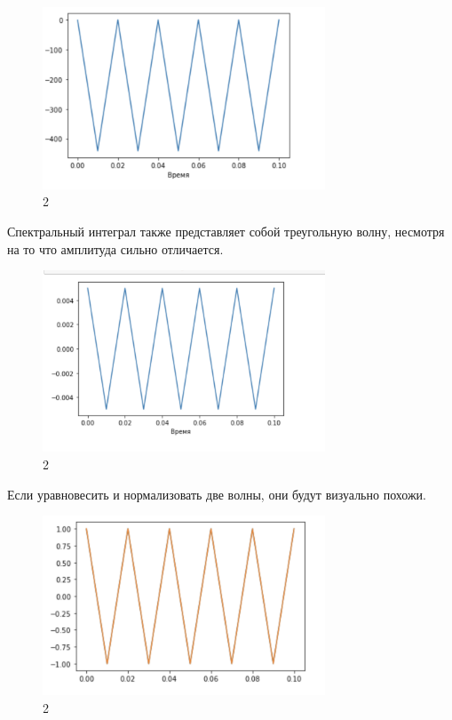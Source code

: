 \documentclass[10pt,a4paper,oneside]{article}
\begin{document}
\begin{figure}[H]
        \centering
        \includegraphics[width=0.75\textwidth]{pics/5.png}
        \caption{2}
        \label{fig:first}
\end{figure}

Спектральный интеграл также представляет собой треугольную волну, несмотря на то что амплитуда сильно отличается.

\begin{figure}[H]
        \centering
        \includegraphics[width=0.75\textwidth]{pics/6.png}
        \caption{2}
        \label{fig:first}
\end{figure}

Если уравновесить и нормализовать две волны, они будут визуально похожи.

\begin{figure}[H]
        \centering
        \includegraphics[width=0.75\textwidth]{pics/7.png}
        \caption{2}
        \label{fig:first}
\end{figure}
\end{document}
